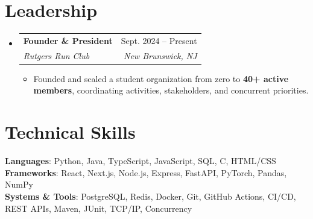 \documentclass[letterpaper,10pt]{article}
\makeatletter
\newcommand{\resumeItem}[1]{\item\small{{#1}}}
\newcommand{\resumeSubheading}[4]{
  \vspace{-1pt}\item
    \begin{tabular*}{0.97\textwidth}[t]{l@{\extracolsep{\fill}}r}
      \textbf{#1} & #2 \\
      \textit{\small#3} & \textit{\small #4} \\
    \end{tabular*}\vspace{-6pt}
}
\newcommand{\resumeSubHeadingListStart}{\begin{itemize}[leftmargin=0.15in, label={}]}
\newcommand{\resumeSubHeadingListEnd}{\end{itemize}}
\newcommand{\resumeItemListStart}{\begin{itemize}[leftmargin=0.15in, itemsep=-3pt, topsep=0pt]}
\newcommand{\resumeItemListEnd}{\end{itemize}\vspace{-3pt}}
\makeatother
\begin{document}
\section{Leadership}
\resumeSubHeadingListStart
  \resumeSubheading
    {Founder \& President}{Sept. 2024 -- Present}
    {Rutgers Run Club}{New Brunswick, NJ}
    \resumeItemListStart
      \resumeItem{Founded and scaled a student organization from zero to \textbf{40+ active members}, coordinating activities, stakeholders, and concurrent priorities.}
    \resumeItemListEnd
\resumeSubHeadingListEnd

\section{Technical Skills}
\begin{itemize}[leftmargin=0.15in, label={}]
  \small{\item{
    \textbf{Languages}{: Python, Java, TypeScript, JavaScript, SQL, C, HTML/CSS} \\
    \textbf{Frameworks}{: React, Next.js, Node.js, Express, FastAPI, PyTorch, Pandas, NumPy} \\
    \textbf{Systems \& Tools}{: PostgreSQL, Redis, Docker, Git, GitHub Actions, CI/CD, REST APIs, Maven, JUnit, TCP/IP, Concurrency}
  }}
\end{itemize}
\end{document}

